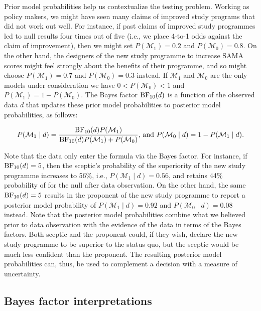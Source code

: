 \documentclass[english,,doc,floatsintext]{apa6}
\begin{document}
Prior model probabilities help us contextualize the testing problem. Working as policy makers, we might have seen many claims of improved study programs that did not work out well. For instance, if past claims of improved study programmes led to null results four times out of five (i.e., we place 4-to-1 odds against the claim of improvement), then we might set \(P( \mathcal{M}_{1}) = 0.2\) and \(P(\mathcal{M}_{0}) = 0.8\). On the other hand, the designers of the new study programme to increase SAMA scores might feel strongly about the benefits of their programme, and so might choose \(P( \mathcal{M}_{1}) = 0.7\) and \(P(\mathcal{M}_{0}) = 0.3\) instead. If \(\mathcal{M}_{1}\) and \(\mathcal{M}_{0}\) are the only models under consideration we have \(0 < P( \mathcal{M}_{0}) < 1\) and \(P( \mathcal{M}_{1})= 1 - P( \mathcal{M}_{0})\). The Bayes factor \(\textnormal{BF}_{10}(d)\) is a function of the observed data \(d\) that updates these prior model probabilities to posterior model probabilities, as follows:

\begin{equation}
\label{eqPriorToPosterior}
P(\mathcal{M}_{1} \mid d) = \frac{ \textnormal{BF}_{10}(d) P(\mathcal{M}_{1})}{\textnormal{BF}_{10}(d) P(\mathcal{M}_{1}) + P(\mathcal{M}_{0})} \text{, and } P(\mathcal{M}_{0} \mid d) = 1 - P(\mathcal{M}_{1} \mid d).
\end{equation}

Note that the data only enter the formula via the Bayes factor. For instance, if \(\textnormal{BF}_{10}(d) = 5\), then the sceptic's probability of the superiority of the new study programme increases to 56\%, i.e., \(P(\mathcal{M}_{1} \mid d)=0.56\), and retains 44\% probability of for the null after data observation. On the other hand, the same \(\textnormal{BF}_{10}(d) = 5\) results in the proponent of the new study programme to report a posterior model probability of \(P(\mathcal{M}_{1} \mid d)=0.92\) and \(P(\mathcal{M}_{0} \mid d)=0.08\) instead. Note that the posterior model probabilities combine what we believed prior to data observation with the evidence of the data in terms of the Bayes factors. Both sceptic and the proponent could, if they wish, declare the new study programme to be superior to the status quo, but the sceptic would be much less confident than the proponent. The resulting posterior model probabilities can, thus, be used to complement a decision with a measure of uncertainty.

\hypertarget{bayes-factor-interpretations}{%
\subsection{Bayes factor interpretations}\label{bayes-factor-interpretations}}
\end{document}
